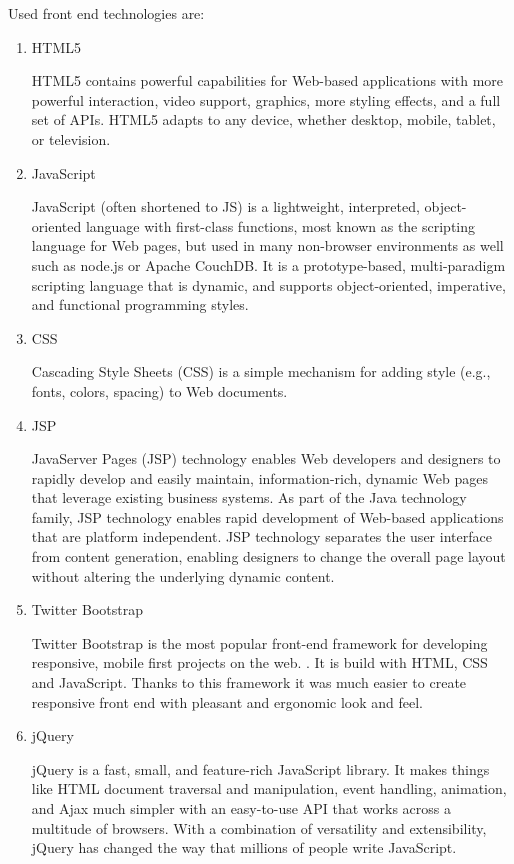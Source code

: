 \documentclass[thesis=B,english]{FITthesis}[2012/10/20]
\begin{document}
Used front end technologies are: 
\begin{enumerate}

\item{HTML5}

HTML5 contains powerful capabilities for Web-based applications with more powerful interaction, video support, graphics, more styling effects, and a full set of APIs. HTML5 adapts to any device, whether desktop, mobile, tablet, or television.\cite{html}

\item{JavaScript}

JavaScript (often shortened to JS) is a lightweight, interpreted, object-oriented language with first-class functions, most known as the scripting language for Web pages, but used in many non-browser environments as well such as node.js or Apache CouchDB. It is a prototype-based, multi-paradigm scripting language that is dynamic, and supports object-oriented, imperative, and functional programming styles.\cite{javascript}

\item{CSS}

Cascading Style Sheets (CSS) is a simple mechanism for adding style (e.g., fonts, colors, spacing) to Web documents.\cite{css}

\item{JSP}

JavaServer Pages (JSP) technology enables Web developers and designers to rapidly develop and easily maintain, information-rich, dynamic Web pages that leverage existing business systems. As part of the Java technology family, JSP technology enables rapid development of Web-based applications that are platform independent. JSP technology separates the user interface from content generation, enabling designers to change the overall page layout without altering the underlying dynamic content.\cite{jsp}

\item{Twitter Bootstrap}

Twitter Bootstrap is the most popular front-end framework for developing responsive, mobile first projects on the web. \cite{bootstrap}. It is build with HTML, CSS and JavaScript. Thanks to this framework it was much easier to create responsive front end with pleasant and ergonomic look and feel.

\item{jQuery}

jQuery is a fast, small, and feature-rich JavaScript library. It makes things like HTML document traversal and manipulation, event handling, animation, and Ajax much simpler with an easy-to-use API that works across a multitude of browsers. With a combination of versatility and extensibility, jQuery has changed the way that millions of people write JavaScript.\cite{jQuery}

\end{enumerate}
\end{document}
